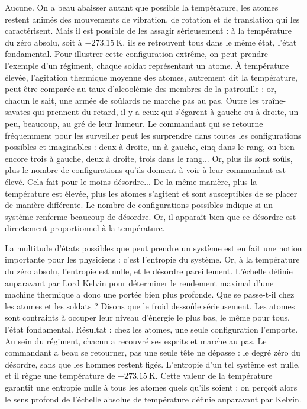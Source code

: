Aucune. On a beau abaisser autant que possible la température, les atomes restent animés des mouvements de vibration, de rotation et de translation qui les caractérisent. Mais il est possible de les assagir sérieusement : à la température du zéro absolu, soit à \(\SI{-273.15}{\kelvin}\), ils se retrouvent tous dans le même état, l'état fondamental. Pour illustrer cette configuration extrême, on peut prendre l'exemple d'un régiment, chaque soldat représentant un atome. À température élevée, l'agitation thermique moyenne des atomes, autrement dit la température, peut être comparée au taux d'alcoolémie des membres de la patrouille : or, chacun le sait, une armée de soûlards ne marche pas au pas. Outre les traîne-savates qui prennent du retard, il y a ceux qui s'égarent à gauche ou à droite, un peu, beaucoup, au gré de leur humeur. Le commandant qui se retourne fréquemment pour les surveiller peut les surprendre dans toutes les configurations possibles et imaginables : deux à droite, un à gauche, cinq dans le rang, ou bien encore trois à gauche, deux à droite, trois dans le rang... Or, plus ils sont soûls, plus le nombre de configurations qu'ils donnent à voir à leur commandant est élevé. Cela fait pour le moins désordre... De la même manière, plus la température est élevée, plus les atomes s'agitent et sont susceptibles de se placer de manière différente. Le nombre de configurations possibles indique si un système renferme beaucoup de désordre. Or, il apparaît bien que ce désordre est directement proportionnel à la température.

La multitude d'états possibles que peut prendre un système est en fait une notion importante pour les physiciens : c'est l'entropie du système. Or, à la température du zéro absolu, l'entropie est nulle, et le désordre pareillement. L'échelle définie auparavant par Lord Kelvin pour déterminer le rendement maximal d'une machine thermique a donc une portée bien plus profonde. Que se passe-t-il chez les atomes et les soldats ? Disons que le froid dessoûle sérieusement. Les atomes sont contraints à occuper leur niveau d'énergie le plus bas, le même pour tous, l'état fondamental. Résultat : chez les atomes, une seule configuration l'emporte. Au sein du régiment, chacun a recouvré ses esprits et marche au pas. Le commandant a beau se retourner, pas une seule tête ne dépasse : le degré zéro du désordre, sans que les hommes restent figés. L'entropie d'un tel système est nulle, et il règne une température de \(\SI{-273.15}{\kelvin}\). Cette valeur de la température garantit une entropie nulle à tous les atomes quels qu'ils soient : on perçoit alors le sens profond de l'échelle absolue de température définie auparavant par Kelvin.

